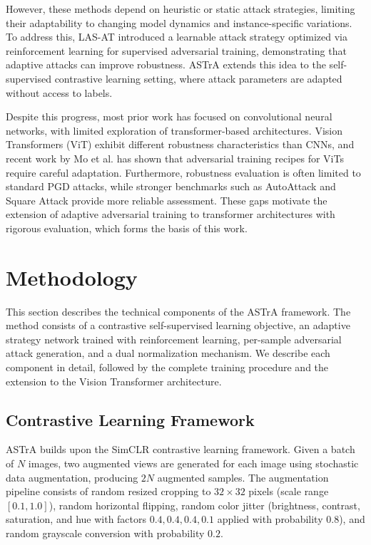 \documentclass[conference]{IEEEtran}
\begin{document}
However, these methods depend on heuristic or static attack strategies, limiting their adaptability to changing model dynamics and instance-specific variations. To address this, LAS-AT \cite{b5} introduced a learnable attack strategy optimized via reinforcement learning for supervised adversarial training, demonstrating that adaptive attacks can improve robustness. ASTrA extends this idea to the self-supervised contrastive learning setting, where attack parameters are adapted without access to labels.

Despite this progress, most prior work has focused on convolutional neural networks, with limited exploration of transformer-based architectures. Vision Transformers (ViT) \cite{b10} exhibit different robustness characteristics than CNNs, and recent work by Mo et al. \cite{b6} has shown that adversarial training recipes for ViTs require careful adaptation. Furthermore, robustness evaluation is often limited to standard PGD attacks, while stronger benchmarks such as AutoAttack \cite{b11} and Square Attack \cite{b12} provide more reliable assessment. These gaps motivate the extension of adaptive adversarial training to transformer architectures with rigorous evaluation, which forms the basis of this work.

\section{Methodology}

This section describes the technical components of the ASTrA framework. The method consists of a contrastive self-supervised learning objective, an adaptive strategy network trained with reinforcement learning, per-sample adversarial attack generation, and a dual normalization mechanism. We describe each component in detail, followed by the complete training procedure and the extension to the Vision Transformer architecture.

\subsection{Contrastive Learning Framework}

ASTrA builds upon the SimCLR \cite{b9} contrastive learning framework. Given a batch of $N$ images, two augmented views are generated for each image using stochastic data augmentation, producing $2N$ augmented samples. The augmentation pipeline consists of random resized cropping to $32 \times 32$ pixels (scale range $[0.1, 1.0]$), random horizontal flipping, random color jitter (brightness, contrast, saturation, and hue with factors $0.4, 0.4, 0.4, 0.1$ applied with probability $0.8$), and random grayscale conversion with probability $0.2$.
\end{document}
